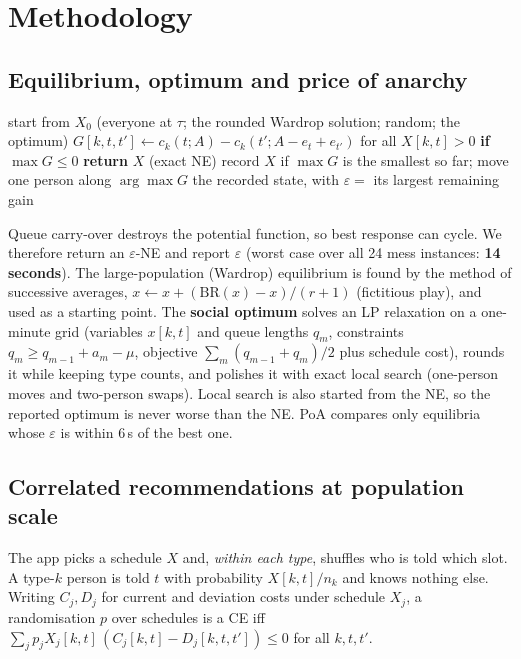 \documentclass{article}
\begin{document}
\section{Methodology}
\subsection{Equilibrium, optimum and price of anarchy}
\begin{algorithm}[H]\small
\caption{Best-response dynamics returning an (\(\varepsilon\)-)Nash equilibrium (\texttt{game.nash\_equilibrium})}\label{alg:br}
\begin{algorithmic}[1]
\State start from $X_0$ (everyone at $\tau$; the rounded Wardrop solution; random; the optimum)
\Repeat
\State $G[k,t,t'] \gets c_k(t;A)-c_k(t';A-e_t+e_{t'})$ for all $X[k,t]>0$ 
\State \textbf{if} $\max G\le 0$ \textbf{return} $X$ (exact NE)
\State record $X$ if $\max G$ is the smallest so far; move one person along $\arg\max G$
\State \Return the recorded state, with $\varepsilon=$ its largest remaining gain
\end{algorithmic}\end{algorithm}
\vspace{-0.5em}
Queue carry-over destroys the potential function, so best response can cycle. We therefore return an
$\varepsilon$-NE and report $\varepsilon$ (worst case over all 24 mess instances: \textbf{14 seconds}). The large-population
(Wardrop) equilibrium is found by the method of successive averages, $x\leftarrow x+(\mathrm{BR}(x)-x)/(r+1)$
(fictitious play), and used as a starting point. The \textbf{social optimum} solves an LP relaxation on a one-minute
grid (variables $x[k,t]$ and queue lengths $q_m$, constraints $q_m\ge q_{m-1}+a_m-\mu$, objective
$\sum_m (q_{m-1}+q_m)/2$ plus schedule cost), rounds it while keeping type counts, and polishes it with exact local
search (one-person moves and two-person swaps). Local search is also started from the NE, so the reported optimum
is never worse than the NE. PoA compares only equilibria whose $\varepsilon$ is within 6\,s of the best one.

\subsection{Correlated recommendations at population scale}
The app picks a schedule $X$ and, \emph{within each type}, shuffles who is told which slot. A type-$k$ person is told
$t$ with probability $X[k,t]/n_k$ and knows nothing else. Writing $C_j,D_j$ for current and deviation costs under
schedule $X_j$, a randomisation $p$ over schedules is a CE iff
$\sum_j p_j X_j[k,t]\,(C_j[k,t]-D_j[k,t,t'])\le 0$ for all $k,t,t'$.
\end{document}

